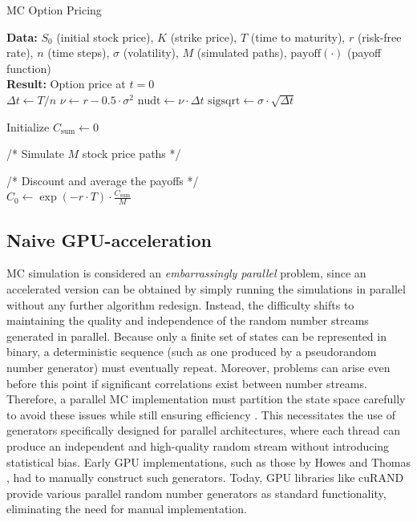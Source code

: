 \documentclass[english,12pt,a4paper,pdftex,sci,utf8]{aaltothesis}
\begin{document}
\begin{algorithm}
\caption{MC Option Pricing}
\label{alg:MC-algo}
\textbf{Data:} $S_0$ (initial stock price), $K$ (strike price), $T$ (time to maturity), $r$ (risk-free rate), $n$ (time steps), $\sigma$ (volatility), $M$ (simulated paths), $\text{payoff}(\cdot)$ (payoff function)\\
\textbf{Result:} Option price at $t=0$\\

$\Delta t \gets T/n$\;
$\nu \gets r - 0.5 \cdot \sigma^2$\;
$\text{nudt} \gets \nu \cdot \Delta t$\;
$\text{sigsqrt} \gets \sigma \cdot \sqrt{\Delta t}$\;

Initialize $C_{\text{sum}} \gets 0$\;

/* Simulate $M$ stock price paths */\\

/* Discount and average the payoffs */\\
$C_0 \gets \exp(-r \cdot T) \cdot \frac{C_{\text{sum}}}{M}$\;

\;
\end{algorithm}


\subsection{Naive GPU-acceleration}
MC simulation is considered an \emph{embarrassingly parallel} problem, since an accelerated version can be obtained by simply running the simulations in parallel without any further algorithm redesign. Instead, the difficulty shifts to maintaining the quality and independence of the random number streams generated in parallel. Because only a finite set of states can be represented in binary, a deterministic sequence (such as one produced by a pseudorandom number generator) must eventually repeat. Moreover, problems can arise even before this point if significant correlations exist between number streams. Therefore, a parallel MC implementation must partition the state space carefully to avoid these issues while still ensuring efficiency \cite{gentle2003random}. This necessitates the use of generators specifically designed for parallel architectures, where each thread can produce an independent and high-quality random stream without introducing statistical bias. Early GPU implementations, such as those by Howes and Thomas \cite{nguyen2007gpu}, had to manually construct such generators. Today, GPU libraries like cuRAND provide various parallel random number generators as standard functionality, eliminating the need for manual implementation.
\end{document}
